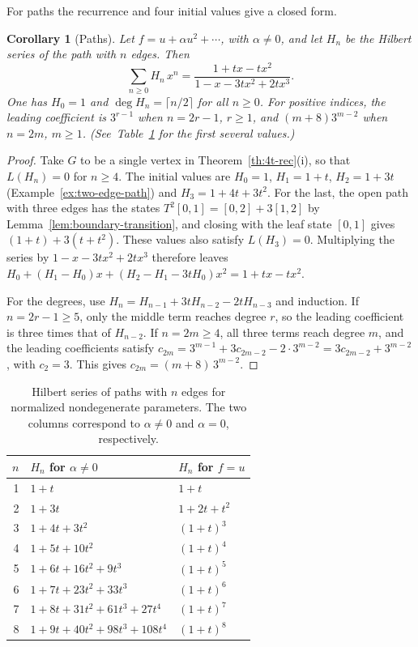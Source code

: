 \documentclass[reqno]{article}
\theoremstyle{plain} %
\newtheorem{corollary}[theorem]{Corollary}
\theoremstyle{definition}
\theoremstyle{remark}
\numberwithin{equation}{section}
\begin{document}
For paths the recurrence and four initial values give a closed form.

\begin{corollary}[Paths]\label{cor:path-series}
Let $f=u+\alpha u^2+\cdots$, with $\alpha\ne0$, and let $H_n$ be the Hilbert series of the path with
$n$ edges. Then
\begin{equation}\label{eq:path-series}
\sum_{n\ge0}H_n\,x^n=\frac{1+tx-tx^2}{1-x-3tx^2+2tx^3}.
\end{equation}
One has $H_0=1$ and $\deg H_n=\lceil n/2\rceil$ for all $n\ge0$.
For positive indices, the leading coefficient is $3^{r-1}$ when
$n=2r-1$, $r\ge1$, and $(m+8)3^{m-2}$ when $n=2m$, $m\ge1$.
(See~Table~\ref{tab:paths} for the first several values.)
\end{corollary}
\begin{proof}
Take $G$ to be a single vertex in Theorem~\ref{th:4t-rec}(i), so that
$L(H_n)=0$ for $n\ge4$. The initial values are $H_0=1$, $H_1=1+t$,
$H_2=1+3t$ (Example~\ref{ex:two-edge-path}) and $H_3=1+4t+3t^2$. For
the last, the open path with three edges has the states
$T^2[0,1]=[0,2]+3[1,2]$ by Lemma~\ref{lem:boundary-transition},
and closing with the leaf state $[0,1]$ gives
$(1+t)+3(t+t^2)$. These values also satisfy $L(H_3)=0$.
Multiplying the series by $1-x-3tx^2+2tx^3$ therefore leaves
$H_0+(H_1-H_0)x+(H_2-H_1-3tH_0)x^2=1+tx-tx^2$.

For the degrees, use $H_n=H_{n-1}+3tH_{n-2}-2tH_{n-3}$ and induction.
If $n=2r-1\ge5$, only the middle term reaches degree $r$, so the leading
coefficient is three times that of $H_{n-2}$. If $n=2m\ge4$, all three
terms reach degree $m$, and the leading coefficients satisfy
$c_{2m}=3^{m-1}+3c_{2m-2}-2\cdot3^{m-2}=3c_{2m-2}+3^{m-2}$, with
$c_2=3$. This gives $c_{2m}=(m+8)\,3^{m-2}$.
\end{proof}

\begin{table}[htbp]
\centering\renewcommand{\arraystretch}{1.12}
\begin{tabular}{rll}\toprule
$n$ & $H_n$ for $\alpha\ne0$ & $H_n$ for $f=u$\\\midrule
1 & $1+t$ & $1+t$\\
2 & $1+3t$ & $1+2t+t^2$\\
3 & $1+4t+3t^2$ & $(1+t)^3$\\
4 & $1+5t+10t^2$ & $(1+t)^4$\\
5 & $1+6t+16t^2+9t^3$ & $(1+t)^5$\\
6 & $1+7t+23t^2+33t^3$ & $(1+t)^6$\\
7 & $1+8t+31t^2+61t^3+27t^4$ & $(1+t)^7$\\
8 & $1+9t+40t^2+98t^3+108t^4$ & $(1+t)^8$\\\bottomrule
\end{tabular}
\caption{Hilbert series of paths with $n$ edges for normalized
nondegenerate parameters. The two columns correspond to $\alpha\ne0$
and $\alpha=0$, respectively.}
\label{tab:paths}
\end{table}
\end{document}
